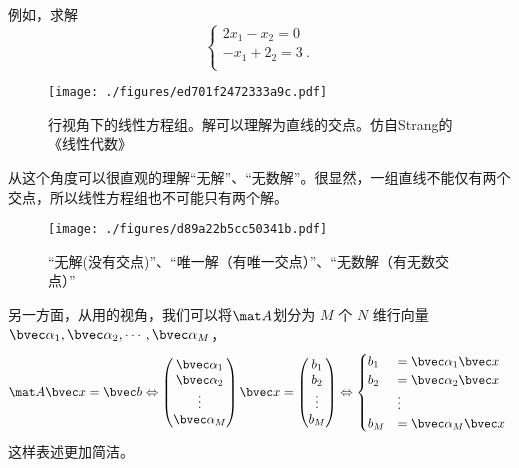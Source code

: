 \begin{example}{}
例如，求解
$$
\begin{cases}
2x_1-x_2=0 \\
-x_1+2_2=3~. \\
\end{cases}
$$
\begin{figure}[ht]
\centering
\texttt{[image: ./figures/ed701f2472333a9c.pdf]}
\caption{行视角下的线性方程组。解可以理解为直线的交点。仿自Strang的《线性代数》} \label{fig_LinEq_2}
\end{figure}
\end{example}
从这个角度可以很直观的理解“无解”、“无数解”。很显然，一组直线不能仅有两个交点，所以线性方程组也不可能只有两个解。
\begin{figure}[ht]
\centering
\texttt{[image: ./figures/d89a22b5cc50341b.pdf]}
\caption{“无解(没有交点)”、“唯一解（有唯一交点）”、“无数解（有无数交点）”} \label{fig_LinEq_3}
\end{figure}

另一方面，从用的视角，我们可以将$\mat A$划分为 $M$ 个 $N$ 维行向量$\bvec \alpha_1, \bvec \alpha_2, \cdots, \bvec \alpha_M$，
$$
\mat A \bvec x=\bvec b \Leftrightarrow 
\begin{pmatrix}
\bvec \alpha_1 \\
\bvec \alpha_2 \\
\vdots \\
\bvec \alpha_M
\end{pmatrix}
\bvec x
=
\begin{pmatrix}
b_1 \\
b_2 \\
\vdots \\
b_M
\end{pmatrix}
\Leftrightarrow 
\begin{cases}
b_1 &= \bvec \alpha_1 \bvec x \\
b_2 &= \bvec \alpha_2 \bvec x \\
&\vdots \\
b_M &= \bvec \alpha_M \bvec x
\end{cases}~
$$
这样表述更加简洁。


